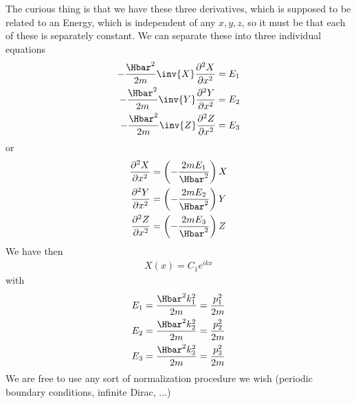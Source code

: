 %
The curious thing is that we have these three derivatives, which is supposed to be related to an Energy, which is independent of any \(x,y,z\), so it must be that each of these is separately constant.  We can separate these into three individual equations
%
\begin{equation}\label{eqn:lecture5BigReviewCh4FreeParticle:140}
\begin{aligned}
-\frac{\Hbar^2}{2m} \inv{X} \frac{\partial^2 X}{\partial {x}^2} &= E_1 \\
-\frac{\Hbar^2}{2m} \inv{Y} \frac{\partial^2 Y}{\partial {x}^2} &= E_2 \\
-\frac{\Hbar^2}{2m} \inv{Z} \frac{\partial^2 Z}{\partial {x}^2} &= E_3
\end{aligned}
\end{equation}
%
or
\begin{equation}\label{eqn:lecture5BigReviewCh4FreeParticle:160}
\begin{aligned}
\frac{\partial^2 X}{\partial {x}^2} &= \left( - \frac{2m E_1}{\Hbar^2} \right) X  \\
\frac{\partial^2 Y}{\partial {x}^2} &= \left( - \frac{2m E_2}{\Hbar^2} \right) Y  \\
\frac{\partial^2 Z}{\partial {x}^2} &= \left( - \frac{2m E_3}{\Hbar^2} \right) Z
\end{aligned}
\end{equation}
%
We have then
%
\begin{equation}\label{eqn:lecture5BigReviewCh4FreeParticle:180}
\begin{aligned}
X(x) = C_1 e^{i k x}
\end{aligned}
\end{equation}
%
with
\begin{equation}\label{eqn:lecture5BigReviewCh4FreeParticle:200}
\begin{aligned}
E_1 &= \frac{\Hbar^2 k_1^2 }{2m} = \frac{p_1^2}{2m} \\
E_2 &= \frac{\Hbar^2 k_2^2 }{2m} = \frac{p_2^2}{2m} \\
E_3 &= \frac{\Hbar^2 k_3^2 }{2m} = \frac{p_3^2}{2m}
\end{aligned}
\end{equation}
%
We are free to use any sort of normalization procedure we wish (periodic boundary conditions, infinite Dirac, ...)

